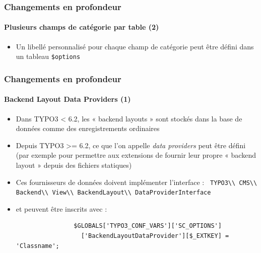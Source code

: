 
\begin{frame}[fragile]
	\frametitle{Changements en profondeur}
	\framesubtitle{Plusieurs champs de catégorie par table (2)}

	\begin{itemize}

		\item Un libellé personnalisé pour chaque champ de catégorie peut être défini dans un tableau \texttt{\$options}

	\end{itemize}

\end{frame}


\begin{frame}[fragile]
	\frametitle{Changements en profondeur}
	\framesubtitle{Backend Layout Data Providers (1)}

	\begin{itemize}
		\item Dans TYPO3 < 6.2, les « backend layouts » sont stockés dans la base de données comme des enregistrements ordinaires
		\item Depuis TYPO3 >= 6.2, ce que l'on appelle \emph{data providers} peut être défini\newline
			\small(par exemple pour permettre aux extensions de fournir leur propre « backend layout » depuis des fichiers statiques)\normalsize

		\item Ces fournisseurs de données doivent implémenter l'interface :\newline
			\smaller\texttt{
				TYPO3\textbackslash\textbackslash
				CMS\textbackslash\textbackslash
				Backend\textbackslash\textbackslash
				View\textbackslash\textbackslash
				BackendLayout\textbackslash\textbackslash
				DataProviderInterface}\normalsize

		\item et peuvent être inscrits avec :

			\begin{lstlisting}
				$GLOBALS['TYPO3_CONF_VARS']['SC_OPTIONS']
				  ['BackendLayoutDataProvider'][$_EXTKEY] = 'Classname';
			\end{lstlisting}


	\end{itemize}

\end{frame}

